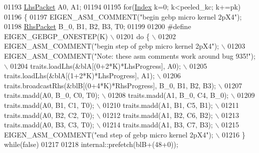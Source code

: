 \begin{DoxyCode}
01193           \hyperlink{class_eigen_1_1internal_1_1_tensor_lazy_evaluator_writable}{LhsPacket} A0, A1;
01194 
01195           \textcolor{keywordflow}{for}(\hyperlink{namespace_eigen_a62e77e0933482dafde8fe197d9a2cfde}{Index} k=0; k<peeled\_kc; k+=pk)
01196           \{
01197             EIGEN\_ASM\_COMMENT(\textcolor{stringliteral}{"begin gebp micro kernel 2pX4"});
01198             \hyperlink{class_eigen_1_1internal_1_1_tensor_lazy_evaluator_writable}{RhsPacket} B\_0, B1, B2, B3, T0;
01199 
01200 \textcolor{preprocessor}{   #define EIGEN\_GEBGP\_ONESTEP(K) \(\backslash\)}
01201 \textcolor{preprocessor}{            do \{                                                                \(\backslash\)}
01202 \textcolor{preprocessor}{              EIGEN\_ASM\_COMMENT("begin step of gebp micro kernel 2pX4");        \(\backslash\)}
01203 \textcolor{preprocessor}{              EIGEN\_ASM\_COMMENT("Note: these asm comments work around bug 935!"); \(\backslash\)}
01204 \textcolor{preprocessor}{              traits.loadLhs(&blA[(0+2*K)*LhsProgress], A0);                    \(\backslash\)}
01205 \textcolor{preprocessor}{              traits.loadLhs(&blA[(1+2*K)*LhsProgress], A1);                    \(\backslash\)}
01206 \textcolor{preprocessor}{              traits.broadcastRhs(&blB[(0+4*K)*RhsProgress], B\_0, B1, B2, B3);  \(\backslash\)}
01207 \textcolor{preprocessor}{              traits.madd(A0, B\_0, C0, T0);                                     \(\backslash\)}
01208 \textcolor{preprocessor}{              traits.madd(A1, B\_0, C4, B\_0);                                    \(\backslash\)}
01209 \textcolor{preprocessor}{              traits.madd(A0, B1,  C1, T0);                                     \(\backslash\)}
01210 \textcolor{preprocessor}{              traits.madd(A1, B1,  C5, B1);                                     \(\backslash\)}
01211 \textcolor{preprocessor}{              traits.madd(A0, B2,  C2, T0);                                     \(\backslash\)}
01212 \textcolor{preprocessor}{              traits.madd(A1, B2,  C6, B2);                                     \(\backslash\)}
01213 \textcolor{preprocessor}{              traits.madd(A0, B3,  C3, T0);                                     \(\backslash\)}
01214 \textcolor{preprocessor}{              traits.madd(A1, B3,  C7, B3);                                     \(\backslash\)}
01215 \textcolor{preprocessor}{              EIGEN\_ASM\_COMMENT("end step of gebp micro kernel 2pX4");          \(\backslash\)}
01216 \textcolor{preprocessor}{            \} while(false)}
01217             
01218             internal::prefetch(blB+(48+0));

\end{DoxyCode}
